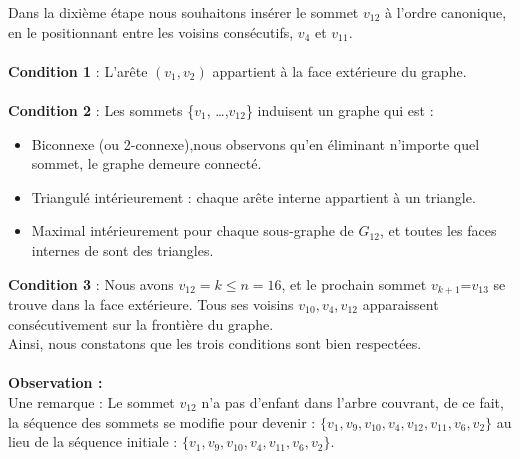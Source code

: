 \documentclass[hidelinks,letterpaper,12pt]{article}
\begin{document}
Dans la dixième étape nous souhaitons insérer le sommet $v_{12}$ à l'ordre canonique, en le positionnant entre les voisins consécutifs, $v_4$ et $v_{11}$.
\\ \\
\textbf{Condition 1} : L'arête \( (v_1,v_2) \) appartient à la face extérieure du graphe.
\\ \\
\textbf{Condition 2} : Les sommets \{$v_1$, \ldots ,$v_{12}$\} induisent un graphe qui est :
\begin{itemize}
\item Biconnexe (ou 2-connexe),nous observons qu'en éliminant n'importe quel sommet, le graphe demeure connecté.
\item Triangulé intérieurement : chaque arête interne appartient à un triangle.
\item Maximal intérieurement pour chaque sous-graphe de $G_{12}$, et toutes les faces internes de sont des triangles.
\\
\end{itemize}
\textbf{Condition 3} : Nous avons $v_{12}=k \leq n=16$, et le prochain sommet $v_{k+1}$=$v_{13}$ se trouve dans la face extérieure. Tous ses voisins \(v_{10}, v_{4}, v_{12}\) apparaissent consécutivement sur la frontière du graphe.
\\
Ainsi, nous constatons que les trois conditions sont bien respectées.
\\ \\
\textbf{Observation :}
\\
Une remarque : Le sommet \(v_{12}\) n'a pas d'enfant dans l'arbre couvrant, de ce fait, la séquence des sommets se modifie pour devenir : \(\{v_1, v_9, v_{10}, v_4, v_{12}, v_{11}, v_6, v_2 \}\) au lieu de la séquence initiale : \(\{v_1, v_9, v_{10}, v_4, v_{11}, v_6, v_2\}\).
\end{document}
